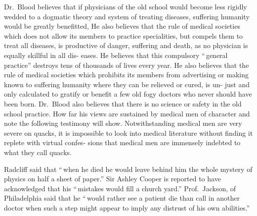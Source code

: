 \documentclass[10pt]{article}
\begin{document}
\begin{multicols}{3}
	Dr.~Blood believes that if physicians of the old school would become\linebreak
	less rigidly wedded to a dogmatic theory and system of treating diseases,\linebreak
	suffering humanity would be greatly benefitted, He also believes that\linebreak
	the rule of medical societies which does not allow its members to practice\linebreak
	specialities, but compels them to treat all diseases, is productive of\linebreak
	danger, suffering and death, as no physician is equally skillful in all dis-\columnbreak\linebreak
	eases. He believes that this compulsory ``\,general practice'' destroys\linebreak
	tens of thousands of lives every year. He also believes that the rule of\linebreak
	medical societies which prohibits its members from advertising or making\linebreak
	known to suffering humanity where they can be relieved or cured, is un-\linebreak
	just and only calculated to gratify or benefit a few old fogy doctors who\linebreak
	never should have been born. Dr.~Blood also believes that there is no\linebreak
	science or safety in the old school practice. How far his views are sustained\linebreak
	by medical men of character and note the following testimony will show.\linebreak
	Notwithstanding medical men are very severe on quacks, it is impossible to\linebreak
	look into medical literature without finding it replete with virtual confes-\linebreak
	sions that medical men are immensely indebted to what they call quacks.

	Radcliff said that ``\,when he died he would leave behind him the\linebreak
	whole mystery of physics on half a sheet of paper.'' Sir Ashley Cooper is\linebreak
	reported to have acknowledged that his ``\,mistakes would fill a church\linebreak
	yard.'' Prof.~Jackson, of Philadelphia said that he ``\,would rather see a\linebreak
	patient die than call in another doctor when such a step might appear to\linebreak
	imply any distrust of his own abilities.''


\end{multicols}
\end{document}

